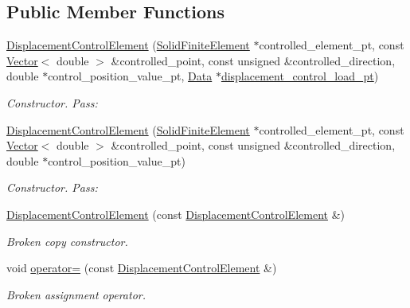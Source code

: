 \subsection*{Public Member Functions}
\begin{DoxyCompactItemize}
\item 
\hyperlink{classoomph_1_1DisplacementControlElement_a697f1427737b62c8ce6d571eb2db2f55}{Displacement\+Control\+Element} (\hyperlink{classoomph_1_1SolidFiniteElement}{Solid\+Finite\+Element} $\ast$controlled\+\_\+element\+\_\+pt, const \hyperlink{classoomph_1_1Vector}{Vector}$<$ double $>$ \&controlled\+\_\+point, const unsigned \&controlled\+\_\+direction, double $\ast$control\+\_\+position\+\_\+value\+\_\+pt, \hyperlink{classoomph_1_1Data}{Data} $\ast$\hyperlink{classoomph_1_1DisplacementControlElement_a4bb140bfc80d122542ad52fd0074171f}{displacement\+\_\+control\+\_\+load\+\_\+pt})
\begin{DoxyCompactList}\small\item\em Constructor. Pass\+: \end{DoxyCompactList}\item 
\hyperlink{classoomph_1_1DisplacementControlElement_ab6db40f99029a39683a30b17ec58b86a}{Displacement\+Control\+Element} (\hyperlink{classoomph_1_1SolidFiniteElement}{Solid\+Finite\+Element} $\ast$controlled\+\_\+element\+\_\+pt, const \hyperlink{classoomph_1_1Vector}{Vector}$<$ double $>$ \&controlled\+\_\+point, const unsigned \&controlled\+\_\+direction, double $\ast$control\+\_\+position\+\_\+value\+\_\+pt)
\begin{DoxyCompactList}\small\item\em Constructor. Pass\+: \end{DoxyCompactList}\item 
\hyperlink{classoomph_1_1DisplacementControlElement_afb18e9ef67f0c7f33eaec32553e5d5ee}{Displacement\+Control\+Element} (const \hyperlink{classoomph_1_1DisplacementControlElement}{Displacement\+Control\+Element} \&)
\begin{DoxyCompactList}\small\item\em Broken copy constructor. \end{DoxyCompactList}\item 
void \hyperlink{classoomph_1_1DisplacementControlElement_af6a93fc12b436e69cf5a95e9e35ca8e1}{operator=} (const \hyperlink{classoomph_1_1DisplacementControlElement}{Displacement\+Control\+Element} \&)
\begin{DoxyCompactList}\small\item\em Broken assignment operator. \end{DoxyCompactList}\item 

\end{DoxyCompactItemize}
